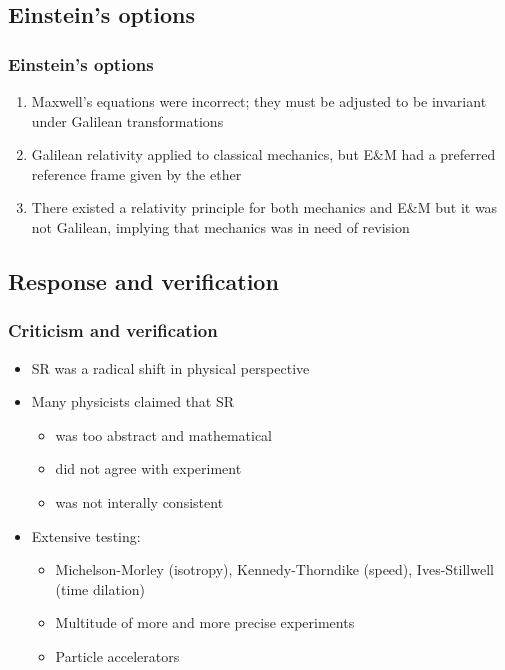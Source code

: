 \documentclass{beamer}
\begin{document}
\subsection{Einstein's options}
\begin{frame}
    \frametitle{Einstein's options}
    \begin{enumerate}
        \item Maxwell's equations were incorrect; they must be adjusted to be invariant under Galilean transformations
        \item Galilean relativity applied to classical mechanics, but E\&M had a preferred reference frame given by the ether
        \item There existed a relativity principle for both mechanics and E\&M but it was not Galilean, implying that mechanics
            was in need of revision
    \end{enumerate}
\end{frame}

\subsection{Response and verification}

\begin{frame}
    \frametitle{Criticism and verification}
    \begin{itemize}
        \item SR was a radical shift in physical perspective
        \item Many physicists claimed that SR 
            \begin{itemize}
                \item was too abstract and mathematical
                \item did not agree with experiment
                \item was not interally consistent
            \end{itemize}
        \item Extensive testing:
            \begin{itemize}
                \item Michelson-Morley (isotropy), Kennedy-Thorndike (speed), Ives-Stillwell (time dilation)
                \item Multitude of more and more precise experiments
                \item Particle accelerators
            \end{itemize}
    \end{itemize}
\end{frame}
\end{document}
